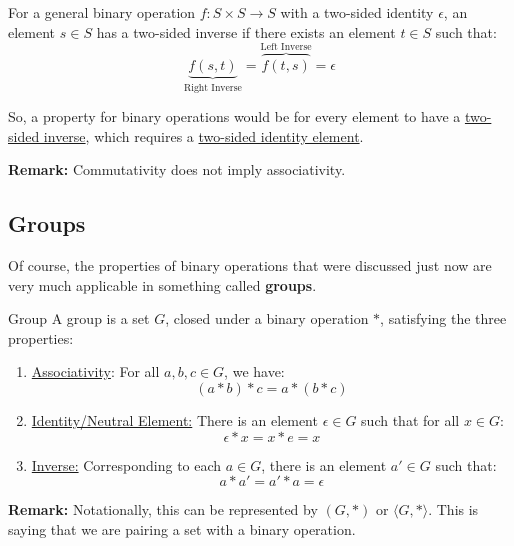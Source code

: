 \documentclass[letterpaper]{article}
\begin{document}
\begin{itemize}
    \bigskip 
    
    For a general binary operation $f: S \times S \to S$ with a two-sided identity $\epsilon$, an element $s \in S$ has a two-sided inverse if there exists an element $t \in S$ such that:
    \[\underbrace{f(s, t)}_{\text{Right Inverse}} = \overbrace{f(t, s)}^{\text{Left Inverse}} = \epsilon\] 

    So, a property for binary operations would be for every element to have a \underline{two-sided inverse}, which requires a \underline{two-sided identity element}.
\end{itemize}

\textbf{Remark:} Commutativity does not imply associativity.

\subsection{Groups}
Of course, the properties of binary operations that were discussed just now are very much applicable in something called \textbf{groups}.

\begin{definition}{Group}{}
    A group is a set $G$, closed under a binary operation $*$, satisfying the three properties:
    \begin{enumerate}
        \item \underline{Associativity}: For all $a, b, c \in G$, we have:
        \[(a * b) * c = a * (b * c)\]

        \item \underline{Identity/Neutral Element:} There is an element $\epsilon \in G$ such that for all $x \in G$:
        \[\epsilon * x = x * e = x\]

        \item \underline{Inverse:} Corresponding to each $a \in G$, there is an element $a' \in G$ such that:
        \[a * a' = a' * a = \epsilon\]
    \end{enumerate}
\end{definition}
\textbf{Remark:} Notationally, this can be represented by $(G, *)$ or $\langle G, * \rangle$. This is saying that we are pairing a set with a binary operation. 
\end{document}
